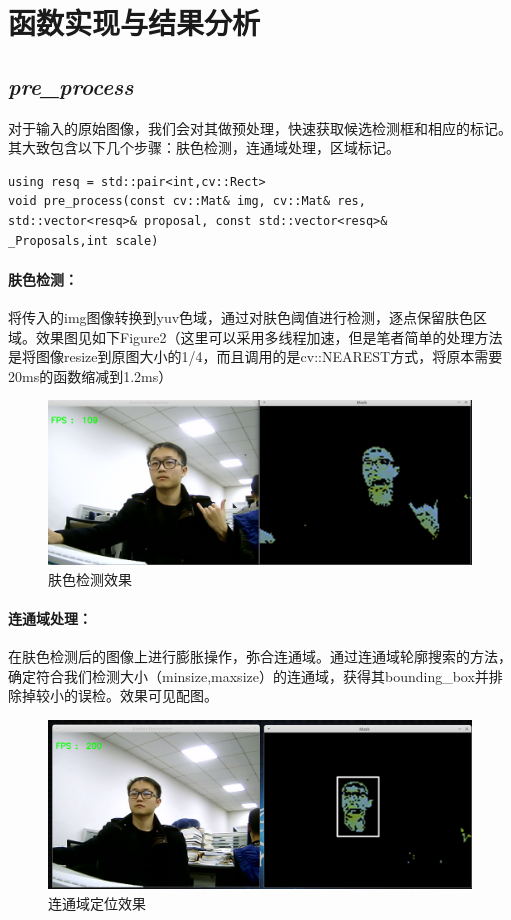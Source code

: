 \documentclass{article}
\begin{document}
\section{函数实现与结果分析}
	\subsection{\emph{pre\_process}}对于输入的原始图像，我们会对其做预处理，快速获取候选检测框和相应的标记。其大致包含以下几个步骤：肤色检测，连通域处理，区域标记。
\lstset{language=C++}
\begin{lstlisting}
using resq = std::pair<int,cv::Rect>
void pre_process(const cv::Mat& img, cv::Mat& res, 
std::vector<resq>& proposal, const std::vector<resq>& 
_Proposals,int scale)
\end{lstlisting}

\paragraph{{\large 肤色检测：}}将传入的img图像转换到yuv色域，通过对肤色阈值进行检测，逐点保留肤色区域。效果图见如下Figure2（这里可以采用多线程加速，但是笔者简单的处理方法是将图像resize到原图大小的1/4，而且调用的是cv::NEAREST方式，将原本需要20ms的函数缩减到1.2ms）
	\begin{figure}[htb]
	\centering
	\centerline{\includegraphics[width = 01.0\textwidth]{pic/handwithoutbb.png}}
	\caption{肤色检测效果}
	\label{fig:label}
	\end{figure}
	
\paragraph{{\large 连通域处理：}}在肤色检测后的图像上进行膨胀操作，弥合连通域。通过连通域轮廓搜索的方法，确定符合我们检测大小（minsize,maxsize）的连通域，获得其bounding\_box并排除掉较小的误检。效果可见配图。
	\begin{figure}[htb]
	\centering
	\centerline{\includegraphics[width = 01.0\textwidth]{pic/facewithbb.png}}
	\caption{连通域定位效果}
	\label{fig:label}
	\end{figure}
	
\end{document}
